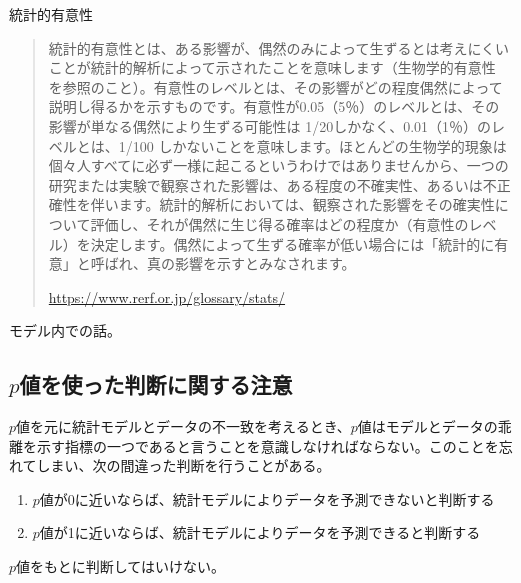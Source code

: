\begin{SMbox}{統計的有意性}
 \begin{quote}
  統計的有意性とは、ある影響が、偶然のみによって生ずるとは考えにくいことが統計的解析によって示されたことを意味します（生物学的有意性 を参照のこと）。有意性のレベルとは、その影響がどの程度偶然によって説明し得るかを示すものです。有意性が0.05（5％）のレベルとは、その影響が単なる偶然により生ずる可能性は 1/20しかなく、0.01（1％）のレベルとは、1/100 しかないことを意味します。ほとんどの生物学的現象は個々人すべてに必ず一様に起こるというわけではありませんから、一つの研究または実験で観察された影響は、ある程度の不確実性、あるいは不正確性を伴います。統計的解析においては、観察された影響をその確実性について評価し、それが偶然に生じ得る確率はどの程度か（有意性のレベル）を決定します。偶然によって生ずる確率が低い場合には「統計的に有意」と呼ばれ、真の影響を示すとみなされます。

  \url{https://www.rerf.or.jp/glossary/stats/}
 \end{quote}

 モデル内での話。
\end{SMbox}


\subsection{$p$値を使った判断に関する注意}
$p$値を元に統計モデルとデータの不一致を考えるとき、$p$値はモデルとデータの乖離を示す指標の一つであると言うことを意識しなければならない。このことを忘れてしまい、次の間違った判断を行うことがある。
\begin{enumerate}
    \item $p$値が0に近いならば、統計モデルによりデータを予測できないと判断する
    \item $p$値が1に近いならば、統計モデルによりデータを予測できると判断する
\end{enumerate}
$p$値をもとに判断してはいけない。





